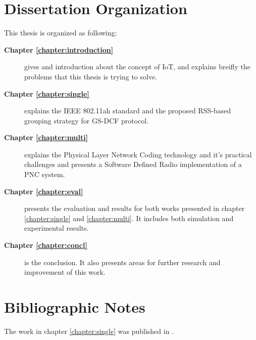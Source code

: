 \section{Dissertation Organization}

This thesis is organized as following:
\begin{description}
\item[\textbf{Chapter \ref{chapter:introduction}}] gives and introduction about the concept of IoT, and explains breifly the problems that this thesis is trying to solve.
\item[\textbf{Chapter \ref{chapter:single}}] explains the IEEE 802.11ah standard and the proposed RSS-based grouping strategy for GS-DCF protocol.
\item[\textbf{Chapter \ref{chapter:multi}}] explains the Physical Layer Network Coding technology and it's practical challenges and presents a Software Defined Radio implementation of a PNC system.
\item[\textbf{Chapter \ref{chapter:eval}}] presents the evaluation and results for both works presented in chapter \ref{chapter:single} and \ref{chapter:multi}. It includes both simulation and experimental results.
\item[\textbf{Chapter \ref{chapter:concl}}] is the conclusion. It also presents areas for further research and improvement of this work.
\end{description}


\section{Bibliographic Notes}
The work in chapter \ref{chapter:single} was published in \cite{ghasemiahmadi2017rss}. 
